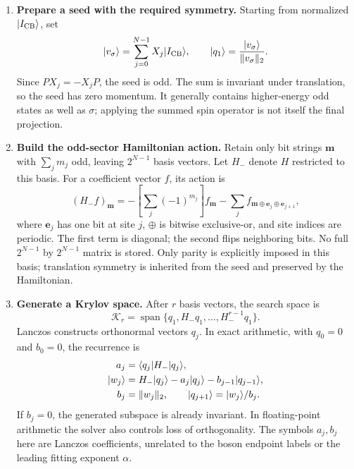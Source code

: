 \begin{enumerate}
\item \textbf{Prepare a seed with the required symmetry.}
Starting from normalized $\lvert I_{\rm CB}\rangle$, set
\begin{equation}
 \lvert v_\sigma\rangle=\sum_{j=0}^{N-1}X_j\lvert I_{\rm CB}\rangle,\qquad
 \lvert q_1\rangle=\frac{\lvert v_\sigma\rangle}{\|v_\sigma\|_2}.
 \label{eq:sigmaseed}
\end{equation}
Since $PX_j=-X_jP$, the seed is odd. The sum is invariant under
translation, so the seed has zero momentum. It generally contains
higher-energy odd states as well as $\sigma$; applying the summed spin
operator is not itself the final projection.
\item \textbf{Build the odd-sector Hamiltonian action.}
Retain only bit strings $\bm m$ with $\sum_jm_j$ odd, leaving
$2^{N-1}$ basis vectors. Let $H_-$ denote $H$ restricted to this basis.
For a coefficient vector $f$, its action is
\begin{equation}
 (H_-f)_{\bm m}=
 -\left[\sum_j(-1)^{m_j}\right]f_{\bm m}
 -\sum_j f_{\bm m\oplus\bm e_j\oplus\bm e_{j+1}},
 \label{eq:oddaction}
\end{equation}
where $\bm e_j$ has one bit at site $j$, $\oplus$ is bitwise exclusive-or,
and site indices are periodic. The first term is diagonal; the second
flips neighboring bits. No full $2^{N-1}$ by $2^{N-1}$ matrix is stored.
Only parity is explicitly imposed in this basis; translation symmetry
is inherited from the seed and preserved by the Hamiltonian.
\item \textbf{Generate a Krylov space.}
After $r$ basis vectors, the search space is
\begin{equation}
 \mathcal K_r=\operatorname{span}
 \{q_1,H_-q_1,\ldots,H_-^{r-1}q_1\}.
\end{equation}
Lanczos constructs orthonormal vectors $q_j$. In exact arithmetic,
with $q_0=0$ and $b_0=0$, the recurrence is
\begin{align}
 a_j&=\langle q_j|H_-|q_j\rangle,\notag\\
 \lvert w_j\rangle&=H_-\lvert q_j\rangle-a_j\lvert q_j\rangle-b_{j-1}\lvert q_{j-1}\rangle,\notag\\
 b_j&=\|w_j\|_2,\qquad \lvert q_{j+1}\rangle=\lvert w_j\rangle/b_j.
 \label{eq:lanczos}
\end{align}
If $b_j=0$, the generated subspace is already invariant. In floating-point
arithmetic the solver also controls loss of orthogonality. The symbols
$a_j,b_j$ here are Lanczos coefficients, unrelated to the boson endpoint
labels or the leading fitting exponent $\alpha$.

\end{enumerate}
